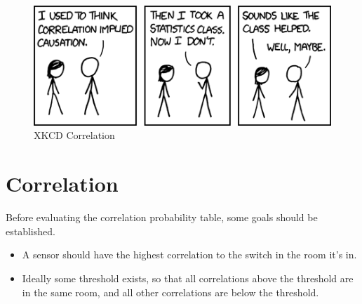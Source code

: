 \begin{figure}[htbp]
\centering
\includegraphics[keepaspectratio,width=\textwidth,height=0.75\textheight]{figures/correlation.png}
\caption{XKCD Correlation}
\label{correlation}
\end{figure}



\section{Correlation}
\label{correlation}

Before evaluating the correlation probability table, some goals should be established.

\begin{itemize}
\item A sensor should have the highest correlation to the switch in the room it's in.

\item Ideally some threshold exists, so that all correlations above the threshold are in the same room, and all other correlations are below the threshold.

\end{itemize}

